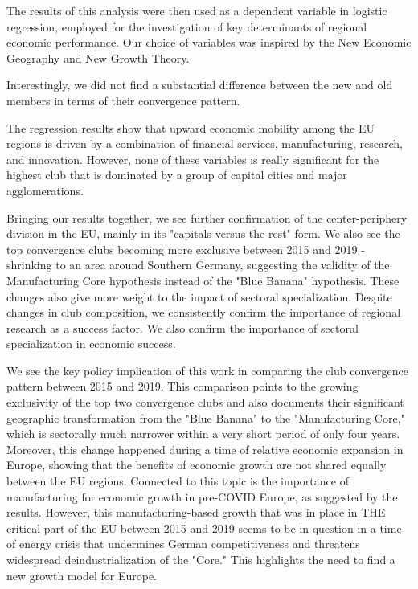 \documentclass[11pt]{article}
\begin{document}
The results of this analysis were then used as a dependent variable in logistic regression, employed for the investigation of key determinants of regional economic performance. Our choice of variables was inspired by the New Economic Geography and New Growth Theory.


Interestingly, we did not find a substantial difference between the new and old members in terms of their convergence pattern.


The regression results show that upward economic mobility among the EU regions is driven by a combination of financial services, manufacturing, research, and innovation. However, none of these variables is really significant for the highest club that is dominated by a group of capital cities and major agglomerations.
 
 
Bringing our results together, we see further confirmation of the center-periphery division in the EU, mainly in its "capitals versus the rest" form. We also see the top convergence clubs becoming more exclusive between 2015 and 2019 - shrinking to an area around Southern Germany, suggesting the validity of the Manufacturing Core hypothesis instead of the "Blue Banana" hypothesis. These changes also give more weight to the impact of sectoral specialization. Despite changes in club composition, we consistently confirm the importance of regional research as a success factor. We also confirm the importance of sectoral specialization in economic success. 


We see the key policy implication of this work in comparing the club convergence pattern between 2015 and 2019. This comparison points to the growing exclusivity of the top two convergence clubs and also documents their significant geographic transformation from the "Blue Banana" to the "Manufacturing Core," which is sectorally much narrower within a very short period of only four years. Moreover, this change happened during a time of relative economic expansion in Europe, showing that the benefits of economic growth are not shared equally between the EU regions. Connected to this topic is the importance of manufacturing for economic growth in pre-COVID Europe, as suggested by the results. However, this manufacturing-based growth that was in place in THE critical part of the EU between 2015 and 2019 seems to be in question in a time of energy crisis that undermines German competitiveness and threatens widespread deindustrialization of the "Core." This highlights the need to find a new growth model for Europe.
\end{document}
